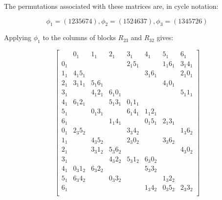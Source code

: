 \begin{example}
The permutations associated with these matrices are, in cycle notation:

\begin{equation}
  \phi _1 = (1235674), \phi _2 = (1524637), \phi _3 = (1345726)
\end{equation}

Applying $\phi _1$ to the columns of blocks $R_{23}$ and $R_{32}$ gives:

\begin{equation*}
  \begin{bmatrix}
         &      0_{1} &   1_{1}    &    2_{1}    &    3_{1}   &    4_{1}    &    5_{1}   &    6_{1}   \\
   0_{1} &            &            &             & 2_{1}5_{1} &             & 1_{1}6_{1} & 3_{1}4_{1} \\
   1_{1} & 4_{1}5_{1} &            &             &            & 3_{1}6_{1}  &            & 2_{1}0_{1} \\
   2_{1} & 3_{1}1_{1} & 5_{1}6_{1} &             &            &             & 4_{1}0_{1} &            \\
   3_{1} &            & 4_{1}2_{1} &  6_{1}0_{1} &            &             &            & 5_{1}1_{1} \\ 
   4_{1} & 6_{1}2_{1} &            &  5_{1}3_{1} & 0_{1}1_{1} &             &            &            \\
   5_{1} &            & 0_{1}3_{1} &             & 6_{1}4_{1} & 1_{1}2_{1}  &            &            \\
   6_{1} &            &            &  1_{1}4_{1} &            & 0_{1}5_{1}  & 2_{1}3_{1} &            \\
   0_{1} & 2_{3}5_{2} &            &             & 3_{3}4_{2} &             &            & 1_{3}6_{2} \\
   1_{1} &            & 4_{3}5_{2} &             & 2_{3}0_{2} &             & 3_{3}6_{2} &            \\
   2_{1} &            & 3_{3}1_{2} &  5_{3}6_{2} &            &             &            & 4_{3}0_{2} \\
   3_{1} &            &            &  4_{3}2_{2} & 5_{3}1_{2} & 6_{3}0_{2}  &            &            \\
   4_{1} & 0_{3}1_{2} & 6_{3}2_{2} &             &            & 5_{3}3_{2}  &            &            \\
   5_{1} & 6_{3}4_{2} &            &  0_{3}3_{2} &            &             & 1_{3}2_{2} &            \\
   6_{1} &            &            &             &            & 1_{3}4_{2}  & 0_{3}5_{2} & 2_{3}3_{2} \\

\end{bmatrix}
\end{equation*}
\end{example}
